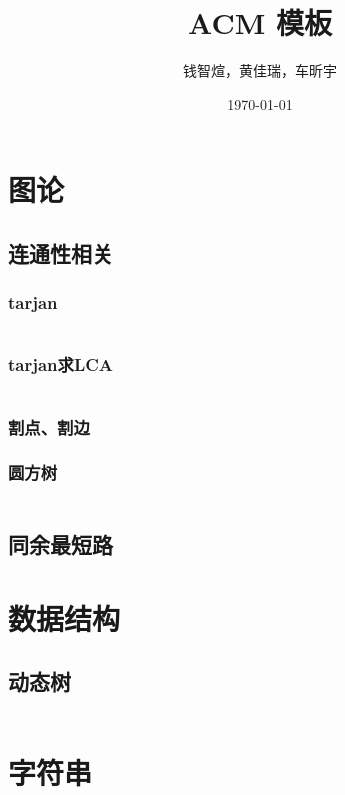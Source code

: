 \documentclass[12pt, a4paper, oneside]{ctexart}
\title{ACM 模板}
\author{钱智煊，黄佳瑞，车昕宇}
\date{\today}
\begin{document}
    \scriptsize
    \maketitle
    \newpage
    
    \begin{multicols}{2}
        \tableofcontents
        \newpage

        \section{图论}
        \subsection{连通性相关}
        \subsubsection{tarjan}
        \inputminted{cpp}{src/graph/tarjan.cpp}
        \subsubsection{tarjan求LCA}
        
        \inputminted{cpp}{src/graph/tarjan_lca.cpp}
        \subsubsection{割点、割边}
        
        \subsubsection{圆方树}
        
        \inputminted{cpp}{src/graph/圆方树.cpp}
        \subsection{同余最短路}
        

        \section{数据结构}
        \subsection{动态树}
        \inputminted{cpp}{src/data structure/LCT.cpp}

        \section{字符串}

\end{multicols}
\end{document}
